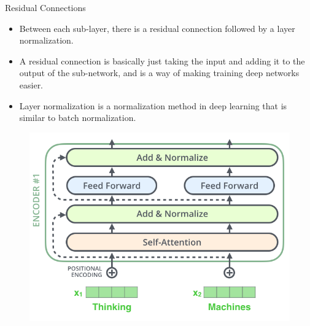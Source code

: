 \documentclass[handout]{beamer}
\begin{document}
\begin{frame}{Residual Connections}
\begin{scriptsize}
\begin{itemize}

\item Between each sub-layer, there is a residual connection followed by a layer normalization. 

\item A residual connection is basically just taking the input and adding it to the output of the sub-network, and is a way of making training deep networks easier. 

\item Layer normalization is a normalization method in deep learning that is similar to batch normalization.
 
\end{itemize}

\end{scriptsize}


 \begin{figure}[h]
        	\includegraphics[scale = 0.3]{pics/transformer_resideual_layer_norm.png}
        \end{figure}


\end{frame}
\end{document}
